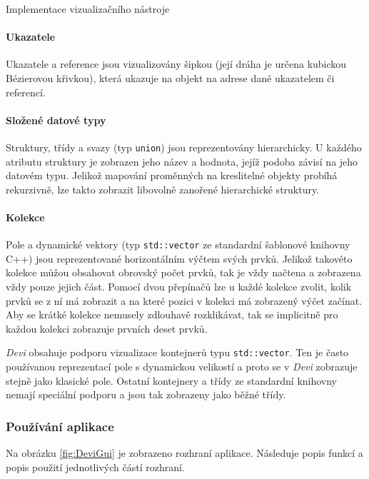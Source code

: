 \documentclass[czech,bachelor,male,python,dept460]{diploma}						%
\newcommand{\parspace}[1][]{
	\ifthenelse{\isempty{#1}}{\vspace{5mm}}{\vspace{#1}}
	\par
}
\begin{document}
\begin{section}{Implementace vizualizačního nástroje}
	\paragraph*{Ukazatele} Ukazatele a reference jsou vizualizovány šipkou (její dráha je určena kubickou Bézierovou křivkou), která ukazuje na objekt na adrese
	dané ukazatelem či referencí. %
	\paragraph*{Složené datové typy} Struktury, třídy a svazy (typ \texttt{union}) jsou reprezentovány hierarchicky. U každého atributu struktury je zobrazen jeho
	název a hodnota, jejíž podoba závisí na jeho datovém typu. Jelikož mapování proměnných na kreslitelné objekty probíhá rekurzivně, lze takto zobrazit
	libovolně zanořené hierarchické struktury.
	\paragraph*{Kolekce} Pole a dynamické vektory (typ \texttt{std::vector} ze standardní šablonové knihovny C++) jsou reprezentované horizontálním výčtem svých prvků.
	Jelikož takovéto kolekce můžou obsahovat obrovský počet prvků, tak je vždy načtena a zobrazena vždy pouze jejich část. Pomocí dvou přepínačů lze u každé
	kolekce zvolit, kolik prvků se z ní má zobrazit a na které pozici v kolekci má zobrazený výčet začínat. Aby se krátké kolekce nemusely zdlouhavě rozklikávat,
	tak se implicitně pro každou kolekci zobrazuje prvních deset prvků.
	
	\parspace \textit{Devi} obsahuje podporu vizualizace kontejnerů typu \texttt{std::vector}. Ten je často používanou
	reprezentací pole s dynamickou velikostí a proto se v \textit{Devi} zobrazuje stejně jako klasické pole. Ostatní kontejnery a třídy ze standardní knihovny
	nemají speciální podporu a jsou tak zobrazeny jako běžné třídy.
	
	\subsubsection{Používání aplikace}
	Na obrázku \ref{fig:DeviGui} je zobrazeno rozhraní aplikace. Následuje popis funkcí a popis použití jednotlivých částí rozhraní.
	
	

\end{section}
\end{document}
